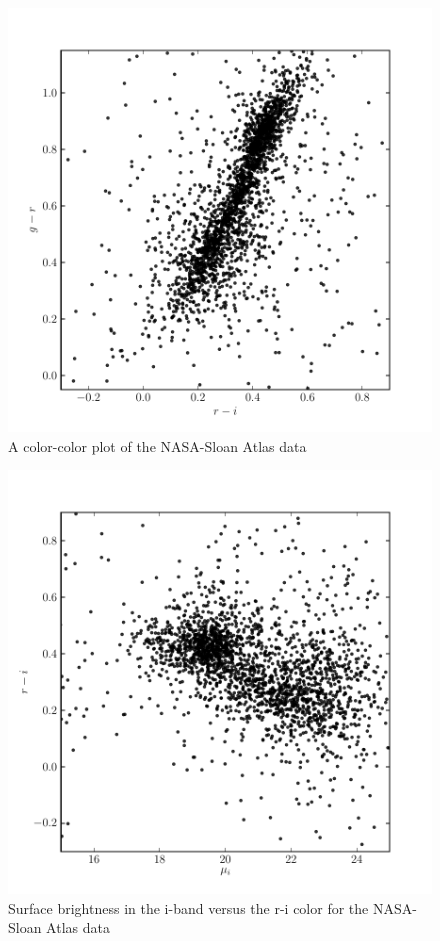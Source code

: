 \documentclass[12pt,preprint,pdftex]{aastex}
\begin{document}
\begin{figure}
\centering
\includegraphics[trim = 15mm 0mm 0mm 0mm]{method_color_nsa.pdf}
\caption{A color-color plot of the NASA-Sloan Atlas data}
\end{figure}

\begin{figure}
\centering
\includegraphics[trim = 15mm 0mm 0mm 0mm]{method_sb2_nsa.pdf}
\caption{Surface brightness in the i-band versus the r-i color for the NASA-Sloan Atlas data}
\end{figure}
\end{document}
